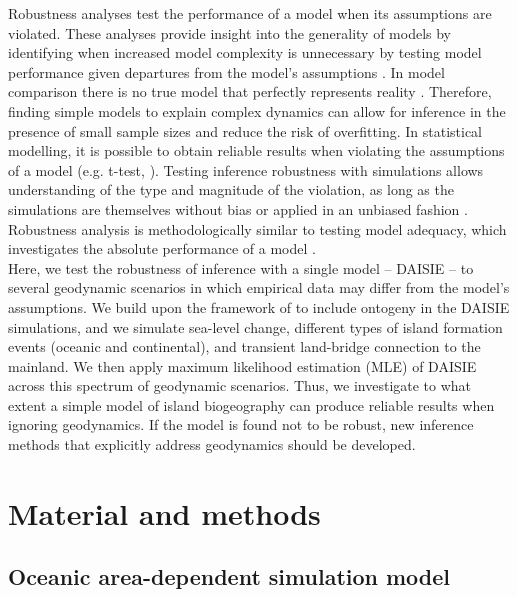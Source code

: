 \documentclass{article}
\begin{document}
Robustness analyses test the performance of a model when its assumptions are violated. These analyses provide insight into the generality of models by identifying when increased model complexity is unnecessary by testing model performance given departures from the model’s assumptions \citep{weisberg_robustness_2006, grimm_robustness_2016}. In model comparison there is no true model that perfectly represents reality \citep{burnham_model_2004}. Therefore, finding simple models to explain complex dynamics can allow for inference in the presence of small sample sizes and reduce the risk of overfitting. In statistical modelling, it is possible to obtain reliable results when violating the assumptions of a model (e.g. t-test, \cite{boneau_effects_1960}). Testing inference robustness with simulations allows understanding of the type and magnitude of the violation, as long as the simulations are themselves without bias or applied in an unbiased fashion \citep{huelsenbeck_performance_1995, hartmann_sampling_2010}. Robustness analysis is methodologically similar to testing model adequacy, which investigates the absolute performance of a model \citep{bollback_bayesian_2002, pennell_model_2015}. \\

Here, we test the robustness of inference with a single model – DAISIE – to several geodynamic scenarios in which empirical data may differ from the model’s assumptions. We build upon the framework of \citep{valente_effects_2014} to include ontogeny in the DAISIE simulations, and we simulate sea-level change, different types of island formation events (oceanic and continental), and transient land-bridge connection to the mainland. We then apply maximum likelihood estimation (MLE) of DAISIE across this spectrum of geodynamic scenarios. Thus, we investigate to what extent a simple model of island biogeography can produce reliable results when ignoring geodynamics. If the model is found not to be robust, new inference methods that explicitly address geodynamics should be developed.

\clearpage

\section*{Material and methods}

\subsection*{Oceanic area-dependent simulation model}
\end{document}
